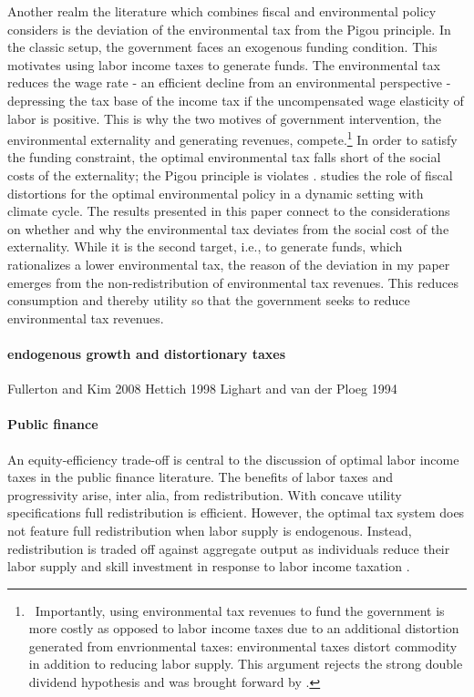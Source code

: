 Another realm the literature which combines fiscal and environmental policy considers is the deviation of the environmental tax from the Pigou principle. In the classic setup, the government faces an exogenous funding condition. This motivates using labor income taxes to generate funds. 
The environmental tax reduces the wage rate - an efficient decline from an environmental perspective - depressing the tax base of the income tax if the uncompensated wage elasticity of labor is positive.  This is why the two motives of government intervention, the environmental externality and generating revenues, compete.\footnote{\ Importantly, using environmental tax revenues to fund the government is more costly as opposed to labor income taxes due to an additional distortion generated from envrionmental taxes: environmental taxes distort commodity in addition to reducing labor supply. This argument rejects the strong double dividend hypothesis and was brought forward by \cite{LansBovenberg1994EnvironmentalTaxation}. } 
In order to satisfy the funding constraint, the optimal environmental tax falls short of the social costs of the externality; the Pigou principle is violates \citep{LansBovenberg1996OptimalAnalyses}. \cite{Barrage2019OptimalPolicy} studies the role of fiscal distortions for the optimal environmental policy in a dynamic setting with climate cycle. 
The results presented in this paper connect to the considerations on whether and why the environmental tax deviates from the social cost of the externality. While it is the second target, i.e., to generate funds, which rationalizes a lower environmental tax, the reason of the deviation in my paper emerges from the non-redistribution of environmental tax revenues. This reduces consumption and thereby utility so that the government seeks to reduce environmental tax revenues. 

\paragraph{endogenous growth and distortionary taxes}
Fullerton and Kim 2008
\cite{Bovenberg1997EnvironmentalGrowth}
Hettich 1998
Lighart and van der Ploeg 1994

\paragraph{Public finance}
An equity-efficiency trade-off is central to the discussion of optimal labor income taxes in the public finance literature.  The benefits of labor taxes and progressivity arise, inter alia, from redistribution. %
With concave utility specifications full redistribution is efficient. However, the optimal tax system does not feature full redistribution when labor supply is endogenous. Instead, redistribution is traded off against aggregate output as individuals reduce their labor supply and skill investment in response to labor income taxation \citep{Heathcote2017OptimalFramework, Conesa2009TaxingAll, Domeij2004OnTaxes}.

